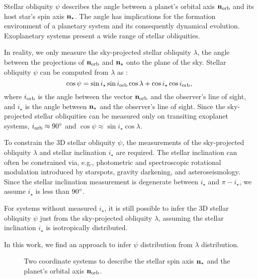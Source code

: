\documentclass[twocolumn,times]{aastex631}
\begin{document}
Stellar obliquity $\psi$ describes the angle between a planet's orbital axis $\bf{n}_{\rm orb}$ and its host star's spin axis $\bf{n}_{\star}$. The angle has implications for the formation environment of a planetary system and its consequently dynamical evolution. Exoplanetary systems present a wide range of stellar obliquities. 

In reality, we only measure the sky-projected stellar obliquity $\lambda$, the angle between the projections of $\bf{n}_{\rm orb}$ and $\bf{n}_{\star}$ onto the plane of the sky. Stellar obliquity $\psi$ can be computed from $\lambda$ as \citep[e.g.,][]{Fabrycky09}:
\begin{equation}\label{eqn:psi}
    \cos{\psi} = \sin{i_\star}\sin{i_{\rm orb}}\cos{\lambda} + \cos{i_\star}\cos{i_{\rm orb}},
\end{equation}
where $i_{\rm orb}$ is the angle between the vector $\bf{n}_{\rm orb}$ and the observer's line of sight, and $i_\star$ is the angle between $\bf{n}_{\star}$ and the observer's line of sight.
Since the sky-projected stellar obliquities can be measured only on transiting exoplanet systems, $i_{\rm orb} \approx 90\mbox{$^\circ$}$ and $\cos{\psi} \approx \sin{i_\star}\cos{\lambda}$.

To constrain the 3D stellar obliquity $\psi$, the measurements of the sky-projected obliquity $\lambda$ and stellar inclination $i_\star$ are required. The stellar inclination can often be constrained via, e.g., photometric and spectroscopic rotational modulation introduced by starspots, gravity darkening, and asteroseismology. Since the stellar inclination measurement is degenerate between $i_\star$ and $\pi - i_\star$, we assume $i_\star$ is less than $90\mbox{$^\circ$}$.

For systems without measured $i_\star$, it is still possible to infer the 3D stellar obliquity $\psi$ just from the sky-projected obliquity $\lambda$, assuming the stellar inclination $i_\star$ is isotropically distributed.

In this work, we find an approach to infer $\psi$ distribution from $\lambda$ distribution.

\begin{figure*}[ht!]
    \vspace*{-1.5cm}
    \caption{Two coordinate systems to describe the stellar spin axis $\bf{n}_{\star}$ and the planet's orbital axis $\bf{n}_{\rm orb}$.}
    \label{fig:coord}
\end{figure*}
\end{document}
